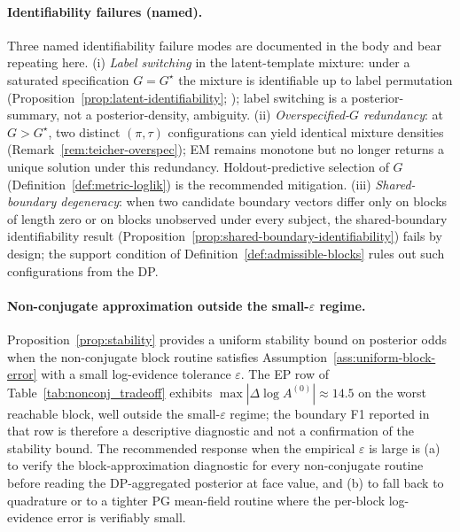 \paragraph{Identifiability failures (named).}
Three named identifiability failure modes are documented in the body and bear repeating here.
(i) \emph{Label switching} in the latent-template mixture: under a saturated specification
$G=G^\star$ the mixture is identifiable up to label permutation
(Proposition~\ref{prop:latent-identifiability}; \citet{teicher1963identifiability}); label
switching is a posterior-summary, not a posterior-density, ambiguity. (ii)
\emph{Overspecified-$G$ redundancy}: at $G>G^\star$, two distinct $(\pi,\tau)$ configurations
can yield identical mixture densities (Remark~\ref{rem:teicher-overspec}); EM remains monotone
but no longer returns a unique solution under this redundancy. Holdout-predictive selection of
$G$ (Definition~\ref{def:metric-loglik}) is the recommended mitigation. (iii)
\emph{Shared-boundary degeneracy}: when two candidate boundary vectors differ only on blocks of
length zero or on blocks unobserved under every subject, the shared-boundary identifiability
result (Proposition~\ref{prop:shared-boundary-identifiability}) fails by design; the support
condition of Definition~\ref{def:admissible-blocks} rules out such configurations from the DP.

\paragraph{Non-conjugate approximation outside the small-$\varepsilon$ regime.}
Proposition~\ref{prop:stability} provides a uniform stability bound on posterior odds when the
non-conjugate block routine satisfies Assumption~\ref{ass:uniform-block-error} with a small
log-evidence tolerance $\varepsilon$. The EP row of Table~\ref{tab:nonconj_tradeoff} exhibits
$\max|\Delta\log A^{(0)}|\approx 14.5$ on the worst reachable block, well outside the
small-$\varepsilon$ regime; the boundary F1 reported in that row is therefore a descriptive
diagnostic and not a confirmation of the stability bound. The recommended response when the
empirical $\varepsilon$ is large is (a) to verify the block-approximation diagnostic for every
non-conjugate routine before reading the DP-aggregated posterior at face value, and (b) to fall
back to quadrature or to a tighter PG mean-field routine where the per-block log-evidence error
is verifiably small.

